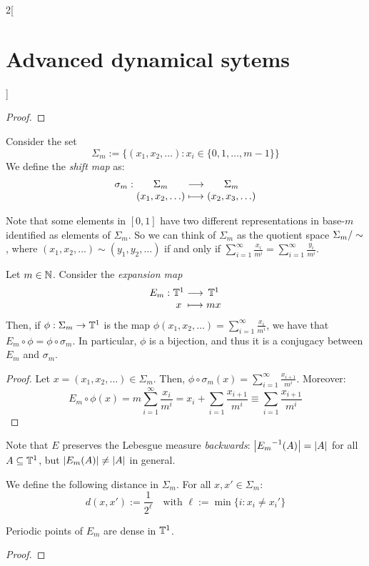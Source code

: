 \documentclass[../../../main_math.tex]{subfiles}
\begin{document}
\begin{multicols}{2}[\section{Advanced dynamical sytems}]
\begin{proof}
  \end{proof}
  \begin{definition}
    Consider the set $$\Sigma_m
      := \{(x_1,x_2,\ldots):x_i\in\{0,1,\ldots,m-1\}\}$$
    We define the \emph{shift map} as:
    $$
      \function{\sigma_m}{\Sigma_m}{\Sigma_m}{(x_1,x_2,\ldots)}{(x_2,x_3,\ldots)}
    $$
  \end{definition}
  \begin{remark}
    Note that some elements in $[0,1]$ have two different representations in base-$m$ identified as elements of $\Sigma_m$. So we can think of $\Sigma_m$ as the quotient space $\quot{\Sigma_m}{\sim}$, where $(x_1,x_2,\ldots)\sim (y_1,y_2,\ldots)$ if and only if $\sum_{i=1}^\infty \frac{x_i}{m^i}=\sum_{i=1}^\infty \frac{y_i}{m^i}$.
  \end{remark}
  \begin{proposition}
    Let $m\in\mathbb{N}$. Consider the \emph{expansion map}
    $$
      \function{E_m}{\TT^1}{\TT^1}{x}{mx}
    $$
    Then, if $\phi:\Sigma_m\to \mathbb{T}^1$ is the map $\phi(x_1,x_2,\ldots)=\sum_{i=1}^\infty \frac{x_i}{m^i}$, we have that $E_m\circ \phi=\phi\circ \sigma_m$. In particular, $\phi$ is a bijection, and thus it is a conjugacy between $E_m$ and $\sigma_m$.
  \end{proposition}
  \begin{proof}
    Let $x=(x_1,x_2,\ldots)\in \Sigma_m$. Then, $\phi\circ \sigma_m(x)=\sum_{i=1}^\infty \frac{x_{i+1}}{m^i}$. Moreover:
    \begin{equation*}
      E_m\circ \phi(x)=m\sum_{i=1}^\infty \frac{x_i}{m^i}=x_i+\sum_{i=1}\frac{x_{i+1}}{m^i}\equiv\sum_{i=1}\frac{x_{i+1}}{m^i}
    \end{equation*}
  \end{proof}
  \begin{remark}
    Note that $E$ preserves the Lebesgue measure \textit{backwards}: $\abs{{E_m}^{-1}(A)}=\abs{A}$ for all $A\subseteq \mathbb{T}^1$, but $\abs{E_m(A)}\ne \abs{A}$ in general.
  \end{remark}
  \begin{definition}
    We define the following distance in $\Sigma_m$. For all $x,x'\in\Sigma_m$:
    $$
      d(x,x'):=\frac{1}{2^\ell}\quad\text{with }\ell:=\min\{i:x_i\ne x_i'\}
    $$
  \end{definition}
  \begin{proposition}
    Periodic points of $E_m$ are dense in $\mathbb{T}^1$.
  \end{proposition}
  \begin{proof}

\end{proof}
\end{multicols}
\end{document}
